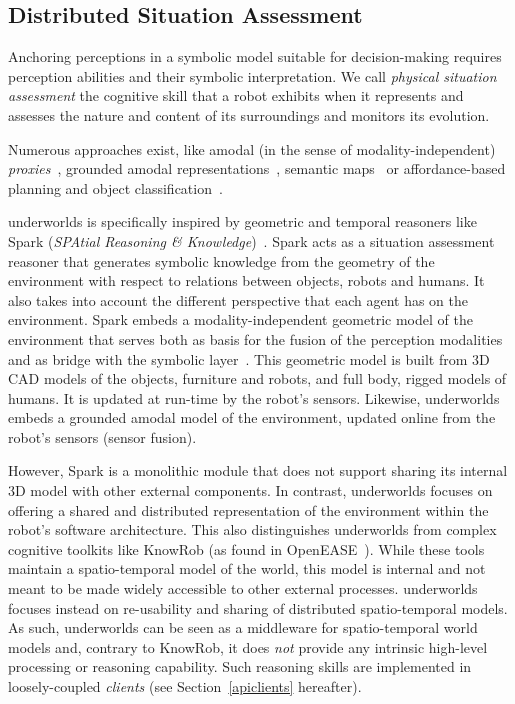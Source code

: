 \documentclass[letterpaper, 10pt, conference]{ieeeconf}
\newcommand{\uwds}{{\sc underworlds}\xspace}
\begin{document}
\subsection{Distributed Situation Assessment}

Anchoring perceptions in a symbolic model suitable for decision-making requires
perception abilities and their symbolic interpretation. We call \emph{physical
situation assessment} the cognitive skill that a robot exhibits when it
represents and assesses the nature and content of its surroundings and monitors
its evolution.

Numerous approaches exist, like amodal (in the sense of modality-independent)
\emph{proxies}~\cite{Jacobsson2008}, grounded amodal
representations~\cite{Mavridis2006}, semantic
maps~\cite{Nuechter2008, Galindo2008,Blodow2011} or affordance-based planning
and object classification~\cite{Lorken2008, Varadarajan2011}.


\uwds is specifically inspired by geometric and temporal reasoners like {\sc Spark}
(\emph{SPAtial Reasoning \& Knowledge})~\cite{sisbot2011situation}.  {\sc Spark}
acts as a situation assessment reasoner that generates symbolic knowledge from
the geometry of the environment with respect to relations between objects,
robots and humans. It also takes into account the different perspective that
each agent has on the environment. {\sc Spark} embeds a modality-independent
geometric model of the environment that serves both as basis for the fusion of
the perception modalities and as bridge with the symbolic
layer~\cite{lemaignan2016artificial}. This geometric model is built from 3D CAD
models of the objects, furniture and robots, and full body, rigged models of
humans. It is updated at run-time by the robot's sensors.  Likewise, \uwds
embeds a grounded amodal model of the environment, updated online from the
robot's sensors (sensor fusion).

However, {\sc Spark} is a monolithic module that does not support sharing its
internal 3D model with other external components. In contrast, \uwds focuses on
offering a shared and distributed representation of the environment within the
robot's software architecture. This also distinguishes \uwds from complex
cognitive toolkits like KnowRob (as found in OpenEASE~\cite{beetz2015open}).
While these tools maintain a spatio-temporal model of the world, this model is
internal and not meant to be made widely accessible to other external processes.
\uwds focuses instead on re-usability and sharing of distributed spatio-temporal
models.  As such, \uwds can be seen as a middleware for spatio-temporal world
models and, contrary to KnowRob, it does \emph{not} provide any intrinsic high-level
processing or reasoning capability. Such reasoning skills are implemented in
loosely-coupled \emph{clients} (see Section~\ref{apiclients} hereafter).
\end{document}
